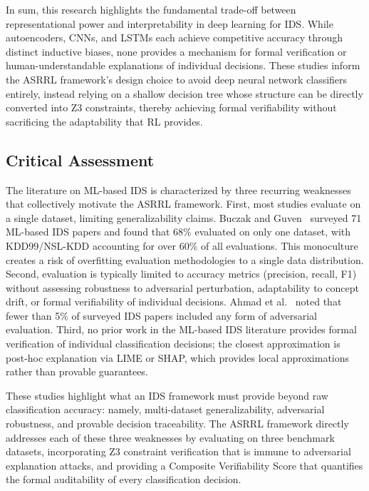 \documentclass[12pt, letterpaper, oneside]{report}
\newcommand{\ASRRL}{\textsc{ASRRL}}
\begin{document}
In sum, this research highlights the fundamental trade-off between representational power and interpretability in deep learning for IDS. While autoencoders, CNNs, and LSTMs each achieve competitive accuracy through distinct inductive biases, none provides a mechanism for formal verification or human-understandable explanations of individual decisions. These studies inform the \ASRRL{} framework's design choice to avoid deep neural network classifiers entirely, instead relying on a shallow decision tree whose structure can be directly converted into Z3 constraints, thereby achieving formal verifiability without sacrificing the adaptability that RL provides.

\subsection{Critical Assessment}

The literature on ML-based IDS is characterized by three recurring weaknesses that collectively motivate the \ASRRL{} framework. First, most studies evaluate on a single dataset, limiting generalizability claims. Buczak and Guven~\cite{buczak2016} surveyed 71 ML-based IDS papers and found that 68\% evaluated on only one dataset, with KDD99/NSL-KDD accounting for over 60\% of all evaluations. This monoculture creates a risk of overfitting evaluation methodologies to a single data distribution. Second, evaluation is typically limited to accuracy metrics (precision, recall, F1) without assessing robustness to adversarial perturbation, adaptability to concept drift, or formal verifiability of individual decisions. Ahmad et al.~\cite{ahmad2021} noted that fewer than 5\% of surveyed IDS papers included any form of adversarial evaluation. Third, no prior work in the ML-based IDS literature provides formal verification of individual classification decisions; the closest approximation is post-hoc explanation via LIME or SHAP, which provides local approximations rather than provable guarantees.

These studies highlight what an IDS framework must provide beyond raw classification accuracy: namely, multi-dataset generalizability, adversarial robustness, and provable decision traceability. The \ASRRL{} framework directly addresses each of these three weaknesses by evaluating on three benchmark datasets, incorporating Z3 constraint verification that is immune to adversarial explanation attacks, and providing a Composite Verifiability Score that quantifies the formal auditability of every classification decision.
\end{document}
